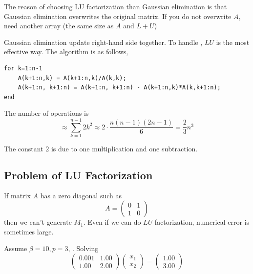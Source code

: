 The reason of choosing LU factorization than Gaussian elimination is that Gaussian elimination overwrites the original matrix. If you do not overwrite $A$, need another array (the same size as $A$ and $L + U$)

Gaussian elimination update right-hand side together. To handle , $LU$ is the most effective way. The algorithm is as follows,

\begin{verbatim}
for k=1:n-1
    A(k+1:n,k) = A(k+1:n,k)/A(k,k);
    A(k+1:n, k+1:n) = A(k+1:n, k+1:n) - A(k+1:n,k)*A(k,k+1:n);
end
\end{verbatim}

The number of operations is \[
    \approx \sum_{k=1}^{n-1} 2k^2 \approx 2 \cdot \frac{n(n-1)(2n-1)}{6} = \frac{2}{3} n^3
\]
\begin{note}
    The constant $2$ is due to one multiplication and one subtraction.
\end{note}

\subsection{Problem of LU Factorization}

If matrix $A$ has a zero diagonal such as \[
    A = \begin{pmatrix}
        0 & 1 \\
        1 & 0
    \end{pmatrix}
\]
then we can't generate $M_1$. Even if we can do $LU$ factorization, numerical error is sometimes large.

\begin{eg}
    Assume $\beta = 10, p = 3$, . Solving \[
        \begin{pmatrix}
            0.001 & 1.00 \\
            1.00 & 2.00
        \end{pmatrix}
        \begin{pmatrix}
            x_1 \\ x_2
        \end{pmatrix}
        =
        \begin{pmatrix}
            1.00\\ 3.00
        \end{pmatrix}
    \]
\end{eg}


